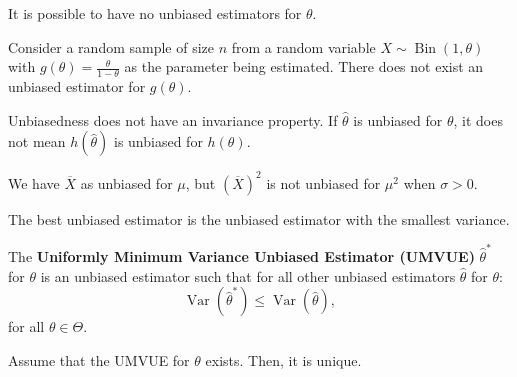 \documentclass{huhtakm-template-book-v2}
\DeclareMathOperator{\Var}{Var}
\DeclareMathOperator{\Bin}{Bin}
\begin{document}
    \begin{rem}
        It is possible to have no unbiased estimators for $\theta$.
    \end{rem}
    \begin{eg}
        Consider a random sample of size $n$ from a random variable $X \sim \Bin(1, \theta)$ with $g(\theta) = \frac{\theta}{1 - \theta}$ as the parameter being estimated. There does not exist an unbiased estimator for $g(\theta)$.
    \end{eg}
    \begin{rem}
        Unbiasedness does not have an invariance property. If $\hat{\theta}$ is unbiased for $\theta$, it does not mean $h(\hat{\theta})$ is unbiased for $h(\theta)$.
    \end{rem}
    \begin{eg}
        We have $\overline{X}$ as unbiased for $\mu$, but $(\overline{X})^{2}$ is not unbiased for $\mu^{2}$ when $\sigma > 0$.
    \end{eg}
    The best unbiased estimator is the unbiased estimator with the smallest variance.
    \begin{defn}
        The \textbf{Uniformly Minimum Variance Unbiased Estimator (UMVUE)} $\hat{\theta}^{*}$ for $\theta$ is an unbiased estimator such that for all other unbiased estimators $\hat{\theta}$ for $\theta$:
        \begin{equation*}
            \Var(\hat{\theta}^{*}) \leq \Var(\hat{\theta}),
        \end{equation*}
        for all $\theta \in \Theta$.
    \end{defn}
    \begin{lem}
        Assume that the UMVUE for $\theta$ exists. Then, it is unique.
    \end{lem}
\end{document}
